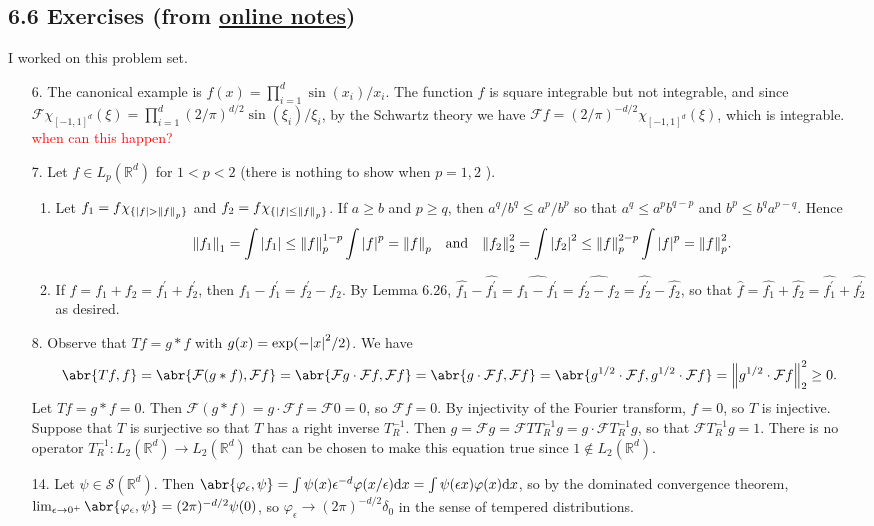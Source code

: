 \documentclass[11pt,leqno]{article}
\theoremstyle{plain}
\theoremstyle{definition}
\numberwithin{equation}{section}
\numberwithin{lem}{section}
\begin{document}
\subsection*{6.6 Exercises (from \href{https://users.oden.utexas.edu/~arbogast/appMath08c.pdf}{online notes})}
I worked on this problem set.
\begin{enumerate}
    \item[6.] The canonical example is $f(x) = \prod_{i=1}^d\sin(x_i)/x_i$. The function $f$ is square integrable but not integrable, and since $\mathcal F\chi_{[-1,1]^d}(\xi) = \prod_{i=1}^d(2/\pi)^{d/2}\sin(\xi_i)/\xi_i$, by the Schwartz theory we have $\mathcal Ff = (2/\pi)^{-d/2}\chi_{[-1,1]^d}(\xi)$, which is integrable. \textcolor{red}{when can this happen?}
    \item[7.] Let $f\in L_p(\mathbb R^d)$ for $1 < p < 2$ (there is nothing to show when $p = 1,2$  ). \begin{enumerate}
      \item Let $f_1 = f\chi_{\{\abs{f}>\norm{f}_p\}}$ and $f_2 = f\chi_{\{\abs{f}\leq \norm{f}_p\}}$. If $a\geq b$ and $p\geq q$, then $a^q/b^q\leq a^p/b^p$ so that $a^q\leq a^pb^{q-p}$ and $b^p\leq b^{q}a^{p-q}$. Hence 
      \[\norm{f_1}_1 = \int \abs{f_1}\leq \norm{f}_p^{1-p}\int \abs{f}^p = \norm{f}_p\quad \text{and}\quad \norm{f_2}_2^2 = \int \abs{f_2}^2\leq \norm{f}_p^{2-p}\int\abs{f}^p = \norm{f}_p^2.\]
      \item If $f = f_1 + f_2 = f_1^\prime + f_2^\prime$, then $f_1 - f_1^\prime = f_2^\prime - f_2$. By Lemma 6.26, $\hat{f_1} - \hat{f_1^\prime} = \widehat{f_1 - f_1^\prime} = \widehat{f_2^\prime - f_2} = \hat{f_2^\prime} - \hat{f_2}$, so that $\hat{f} = \hat{f_1} + \hat{f_2} = \hat{f_1^\prime} + \hat{f_2^\prime}$ as desired.
    \end{enumerate}
    \item[8.] Observe that $Tf = g\ast f$ with $g(x)= \exp\relax(-\abs{x}^2/2)$. We have 
    \[\abr{Tf,f} = \abr{\mathcal F(g\ast f),\mathcal Ff} = \abr{\mathcal Fg\cdot \mathcal Ff,\mathcal Ff} = \abr{g\cdot \mathcal Ff,\mathcal Ff} = \abr{g^{1/2}\cdot\mathcal Ff,g^{1/2}\cdot\mathcal Ff} = \norm{g^{1/2}\cdot\mathcal Ff}_2^2\geq 0.\]
    Let $Tf = g\ast f = 0$. Then $\mathcal F(g\ast f) = g\cdot\mathcal Ff = \mathcal F0 = 0$, so $\mathcal Ff = 0$. By injectivity of the Fourier transform, $f = 0$, so $T$ is injective. Suppose that $T$ is surjective so that $T$ has a right inverse $T_R^{-1}$. Then $g = \mathcal Fg = \mathcal FTT_R^{-1}g = g\cdot\mathcal FT_R^{-1}g$, so that $\mathcal FT_R^{-1}g = 1$. There is no operator $T_R^{-1}\colon L_2(\mathbb R^d)\to L_2(\mathbb R^d)$ that can be chosen to make this equation true since $1\not\in L_2(\mathbb R^d)$.
    \item[14.] Let $\psi\in \mathcal S(\mathbb R^d)$. Then $\abr{\varphi_\epsilon,\psi} = \int\psi(x)\epsilon^{-d}\varphi(x/\epsilon)\dd x = \int\psi(\epsilon x)\varphi(x)\dd x$, so by the dominated convergence theorem, $\lim_{\epsilon\to 0^+}\abr{\varphi_\epsilon, \psi} = (2\pi)^{-d/2}\psi(0)$, so $\varphi_\epsilon\to (2\pi)^{-d/2}\delta_0$ in the sense of tempered distributions.
    

\end{enumerate}
\end{document}
